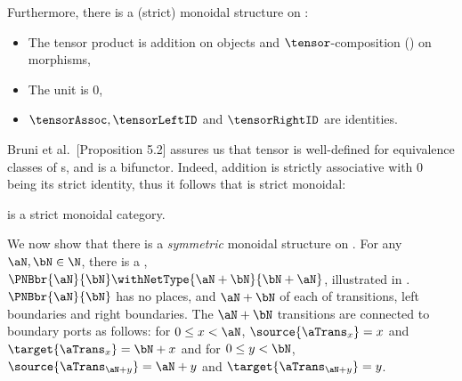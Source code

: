 Furthermore, there is a (strict) monoidal structure on \PNBCat:

\begin{itemize}
    \item The tensor product is addition on objects and $\tensor$-composition
        () on morphisms,
    \item The unit is $0$,
    \item $\tensorAssoc, \tensorLeftID$ and $\tensorRightID$ are identities.
\end{itemize}

{Bruni et al.}~\cite{Bruni2013}[Proposition 5.2] assures us that tensor is
well-defined for equivalence classes of \PNB{}s, and is a bifunctor. Indeed,
addition is strictly associative with 0 being its strict identity, thus it
follows that \PNBCat{} is strict monoidal:

\begin{proposition}\label{prop:PNBMonCat}
    \PNBCat{} is a strict monoidal category.
\end{proposition}

We now show that there is a \emph{symmetric} monoidal structure on \PNBCat{}.
For any $\aN, \bN \in \N$, there is a \PNB{}, $\PNBbr{\aN}{\bN} \withNetType{\aN +
\bN}{\bN + \aN}$, illustrated in . $\PNBbr{\aN}{\bN}$ has no
places, and $\aN + \bN$ of each of transitions, left boundaries and right boundaries. The
$\aN + \bN$ transitions are connected to boundary ports as follows: for $0 \le
x < \aN$, $\source{\aTrans_{x}}=x$ and $\target{\aTrans_{x}}=\bN + x$ and
for $0 \le y < \bN$, $\source{\aTrans_{\aN + y}}=\aN + y$ and
$\target{\aTrans_{\aN + y}}=y$.

\makeatletter
{}
\makeatother

